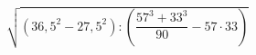 \begin{ex}[type=calculate]
	\begin{condition}
		\( \sqrt{(36,5^2-27,5^2):\left( \dfrac{57^3+33^3}{90}-57\cdot33 \right)} \)
	\end{condition}
\end{ex}